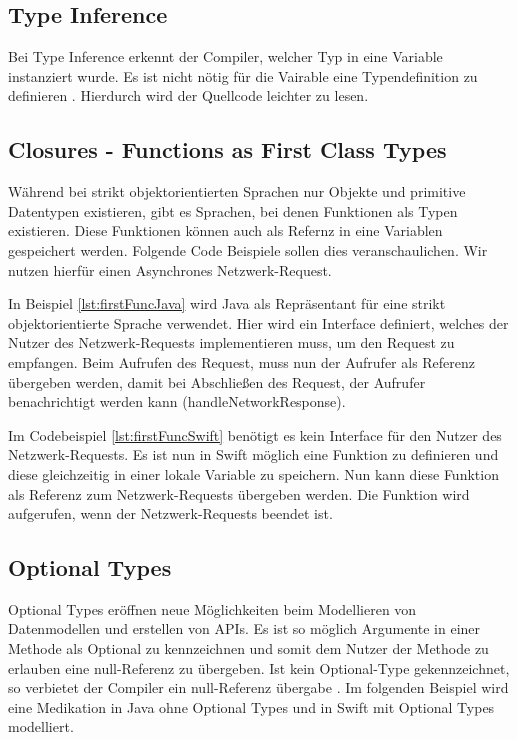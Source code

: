\subsection{Type Inference}
Bei Type Inference erkennt der Compiler, welcher Typ in eine Variable instanziert wurde. Es ist nicht nötig für die Vairable eine Typendefinition zu definieren \cite{Apple:2014sp}. Hierdurch wird der Quellcode leichter zu lesen. 


\subsection{Closures - Functions as First Class Types}
Während bei strikt objektorientierten Sprachen nur Objekte und primitive Datentypen existieren, gibt es Sprachen, bei denen Funktionen als Typen existieren. Diese Funktionen können auch als Refernz in eine Variablen gespeichert werden. Folgende Code Beispiele sollen dies veranschaulichen. Wir nutzen hierfür einen Asynchrones Netzwerk-Request\cite{Apple:2014sp}.

 In Beispiel \ref{lst:firstFuncJava} wird Java als Repräsentant für eine strikt objektorientierte Sprache verwendet. Hier wird ein Interface definiert, welches der Nutzer des Netzwerk-Requests implementieren muss, um den Request zu empfangen. Beim Aufrufen des Request, muss nun der Aufrufer als Referenz übergeben werden, damit bei Abschließen des Request, der Aufrufer benachrichtigt werden kann (handleNetworkResponse). 

Im Codebeispiel \ref{lst:firstFuncSwift} benötigt es kein Interface für den Nutzer des Netzwerk-Requests. Es ist nun in Swift möglich eine Funktion zu definieren und diese gleichzeitig in einer lokale Variable zu speichern. Nun kann diese Funktion als Referenz zum Netzwerk-Requests übergeben werden. Die Funktion wird aufgerufen, wenn der Netzwerk-Requests beendet ist. 


\subsection{Optional Types}
Optional Types eröffnen neue Möglichkeiten beim Modellieren von Datenmodellen und erstellen von APIs. Es ist so möglich Argumente in einer Methode als Optional zu kennzeichnen und somit dem Nutzer der Methode zu erlauben eine null-Referenz zu übergeben. Ist kein Optional-Type gekennzeichnet, so verbietet der Compiler ein null-Referenz übergabe \cite{Apple:2014sp}. Im folgenden Beispiel wird eine Medikation in Java ohne Optional Types und in Swift mit Optional Types modelliert.
 


